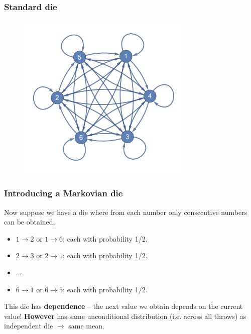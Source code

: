 \documentclass[handout]{beamer}
\begin{document}
\begin{frame}
	\frametitle{Standard die}
	
	\begin{figure}[ht]
		\centerline{\includegraphics[width=0.75\textwidth]{animations_figures/lec6_independentDie.pdf}}
	\end{figure}
	
\end{frame}

\begin{frame}
	\frametitle{Introducing a Markovian die}
	 Now suppose we have a die where from each number only consecutive numbers can be obtained,
	
	\begin{itemize}
		\item<3-> $1\rightarrow 2$ or $1\rightarrow 6$; each with probability 1/2.
		\item<4-> $2\rightarrow 3$ or $2\rightarrow 1$; each with probability 1/2.
		\item<5-> ...
		\item<6-> $6\rightarrow 1$ or $6\rightarrow 5$; each with probability 1/2.
	\end{itemize}
	
	 This die has \textbf{dependence} -- the next value we obtain depends on the current value!
	\onslide<8-> \textbf{However} has same unconditional distribution (i.e. across all throws) as independent die \onslide<9-> $\rightarrow$ same mean.
	
\end{frame}
\end{document}
